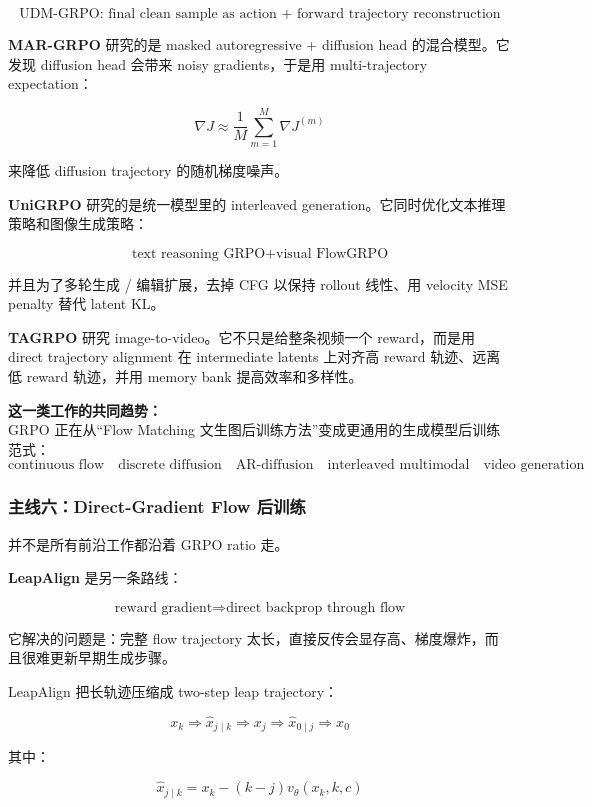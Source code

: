 \[
\text{UDM-GRPO: final clean sample as action + forward trajectory reconstruction}
\]

\textbf{MAR-GRPO} 研究的是 masked autoregressive + diffusion head 的混合模型。它发现 diffusion head 会带来 noisy gradients，于是用 multi-trajectory expectation：

\[
\nabla J
\approx
\frac{1}{M}
\sum_{m=1}^{M}
\nabla J^{(m)}
\]

来降低 diffusion trajectory 的随机梯度噪声。

\textbf{UniGRPO} 研究的是统一模型里的 interleaved generation。它同时优化文本推理策略和图像生成策略：

\[
\text{text reasoning GRPO}
+
\text{visual FlowGRPO}
\]

并且为了多轮生成 / 编辑扩展，去掉 CFG 以保持 rollout 线性、用 velocity MSE penalty 替代 latent KL。

\textbf{TAGRPO} 研究 image-to-video。它不只是给整条视频一个 reward，而是用 direct trajectory alignment 在 intermediate latents 上对齐高 reward 轨迹、远离低 reward 轨迹，并用 memory bank 提高效率和多样性。

\begin{summarybox}
\textbf{这一类工作的共同趋势：}\\
GRPO 正在从“Flow Matching 文生图后训练方法”变成更通用的生成模型后训练范式：
\[
\text{continuous flow}
\quad
\text{discrete diffusion}
\quad
\text{AR-diffusion}
\quad
\text{interleaved multimodal}
\quad
\text{video generation}
\]
\end{summarybox}

\subsubsection{主线六：Direct-Gradient Flow 后训练}

并不是所有前沿工作都沿着 GRPO ratio 走。

\textbf{LeapAlign} 是另一条路线：

\[
\text{reward gradient}
\Rightarrow
\text{direct backprop through flow}
\]

它解决的问题是：完整 flow trajectory 太长，直接反传会显存高、梯度爆炸，而且很难更新早期生成步骤。

LeapAlign 把长轨迹压缩成 two-step leap trajectory：

\[
x_k
\Rightarrow
\hat{x}_{j\mid k}
\Rightarrow
x_j
\Rightarrow
\hat{x}_{0\mid j}
\Rightarrow
x_0
\]

其中：

\[
\hat{x}_{j\mid k}
=
x_k-(k-j)v_\theta(x_k,k,c)
\]

